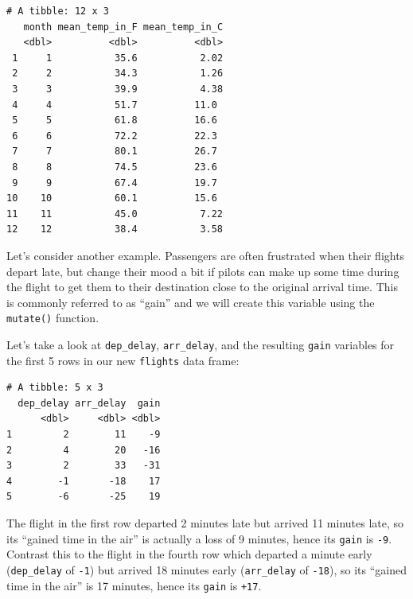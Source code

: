 \documentclass[12pt, krantz2,]{krantz}
\makeatletter
\newenvironment{Shaded}{\begin{snugshade}}{\end{snugshade}}
\newcommand{\DataTypeTok}[1]{\textcolor[rgb]{0.27,0.27,0.27}{#1}}
\newcommand{\KeywordTok}[1]{\textcolor[rgb]{0.27,0.27,0.27}{\textbf{#1}}}
\newcommand{\NormalTok}[1]{#1}
\newcommand{\OperatorTok}[1]{\textcolor[rgb]{0.43,0.43,0.43}{\textbf{#1}}}
\newcommand{\StringTok}[1]{\textcolor[rgb]{0.5,0.5,0.5}{#1}}
\newenvironment{kframe}{%
\medskip{}
\setlength{\fboxsep}{.8em}
 \def\at@end@of@kframe{}%
 \ifinner\ifhmode%
  \def\at@end@of@kframe{\end{minipage}}%
  \begin{minipage}{\columnwidth}%
 \fi\fi%
 \def\FrameCommand##1{\hskip\@totalleftmargin \hskip-\fboxsep
 \colorbox{shadecolor}{##1}\hskip-\fboxsep
     \hskip-\linewidth \hskip-\@totalleftmargin \hskip\columnwidth}%
 \MakeFramed {\advance\hsize-\width
   \@totalleftmargin\z@ \linewidth\hsize
   \@setminipage}}%
 {\par\unskip\endMakeFramed%
 \at@end@of@kframe}
\renewenvironment{Shaded}{\begin{kframe}}{\end{kframe}}
\makeatother
\begin{document}
\begin{verbatim}
# A tibble: 12 x 3
   month mean_temp_in_F mean_temp_in_C
   <dbl>          <dbl>          <dbl>
 1     1           35.6           2.02
 2     2           34.3           1.26
 3     3           39.9           4.38
 4     4           51.7          11.0 
 5     5           61.8          16.6 
 6     6           72.2          22.3 
 7     7           80.1          26.7 
 8     8           74.5          23.6 
 9     9           67.4          19.7 
10    10           60.1          15.6 
11    11           45.0           7.22
12    12           38.4           3.58
\end{verbatim}

Let's consider another example. Passengers are often frustrated when their flights depart late, but change their mood a bit if pilots can make up some time during the flight to get them to their destination close to the original arrival time. This is commonly referred to as ``gain'' and we will create this variable using the \texttt{mutate()} function.

\begin{Shaded}
\end{Shaded}

Let's take a look at \texttt{dep\_delay}, \texttt{arr\_delay}, and the resulting \texttt{gain} variables for the first 5 rows in our new \texttt{flights} data frame:

\begin{verbatim}
# A tibble: 5 x 3
  dep_delay arr_delay  gain
      <dbl>     <dbl> <dbl>
1         2        11    -9
2         4        20   -16
3         2        33   -31
4        -1       -18    17
5        -6       -25    19
\end{verbatim}

The flight in the first row departed 2 minutes late but arrived 11 minutes late, so its ``gained time in the air'' is actually a loss of 9 minutes, hence its \texttt{gain} is \texttt{-9}. Contrast this to the flight in the fourth row which departed a minute early (\texttt{dep\_delay} of \texttt{-1}) but arrived 18 minutes early (\texttt{arr\_delay} of \texttt{-18}), so its ``gained time in the air'' is 17 minutes, hence its \texttt{gain} is \texttt{+17}.
\end{document}
